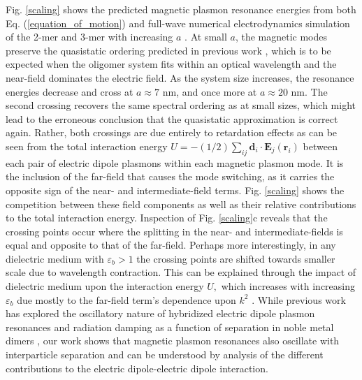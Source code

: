 \documentclass[journal=apchd5,manuscript=article]{achemso}
\begin{document}
Fig. \ref{scaling} shows the predicted magnetic plasmon resonance energies from both Eq. (\ref{equation_of_motion}) and full-wave numerical electrodynamics simulation of the 2-mer and 3-mer with increasing $a$ \cite{Hohenester2012}. At small $a$, the magnetic modes preserve the quasistatic ordering predicted in previous work \cite{Cherqui2014}, which is to be expected when the oligomer system fits within an optical wavelength and the near-field dominates the electric field. As the system size increases, the resonance energies decrease and cross at $a \approx 7$ nm, and once more at $a \approx 20$ nm. The second crossing recovers the same spectral ordering as at small sizes, which might lead to the erroneous conclusion that the quasistatic approximation is correct again. Rather, both crossings are due entirely to retardation effects as can be seen from the total interaction energy $U = -({1}/{2}) \sum_{ij} \textbf{d}_i \cdot \textbf{E}_j(\textbf{r}_i)$ between each pair of electric dipole plasmons within each magnetic plasmon mode. It is the inclusion of the far-field that causes the mode switching, as it carries the opposite sign of the near- and intermediate-field terms. Fig. \ref{scaling} shows the competition between these field components as well as their relative contributions to the total interaction energy. Inspection of Fig. \ref{scaling}c reveals that the crossing points occur where the splitting in the near- and intermediate-fields is equal and opposite to that of the far-field. Perhaps more interestingly, in any dielectric medium with $\varepsilon_b > 1$ the crossing points are shifted towards smaller scale due to wavelength contraction. This can be explained through the impact of dielectric medium upon the interaction energy $U,$ which increases with increasing $\varepsilon_b$ due mostly to the far-field term's dependence upon $k^2$ \cite{Elsayed2008}. While previous work has explored the oscillatory nature of hybridized electric dipole plasmon resonances and radiation damping as a function of separation in noble metal dimers \cite{vonPlessen2007}, our work shows that magnetic plasmon resonances also oscillate with interparticle separation and can be understood by analysis of the different contributions to the electric dipole-electric dipole interaction.
\end{document}
